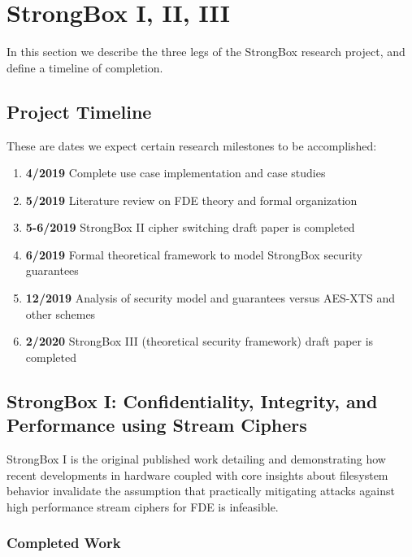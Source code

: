 \chapter{StrongBox I, II, III} \label{chp:strongbox}

In this section we describe the three legs of the StrongBox research project,
and define a timeline of completion.

\section{Project Timeline}

These are dates we expect certain research milestones to be accomplished:

\begin{enumerate}
    \item \textbf{4/2019} Complete use case implementation and case studies
    \item \textbf{5/2019} Literature review on FDE theory and formal
    organization
    \item \textbf{5-6/2019} StrongBox II cipher switching draft paper is
    completed
    \item \textbf{6/2019} Formal theoretical framework to model StrongBox
    security guarantees
    \item \textbf{12/2019} Analysis of security model and guarantees versus
    AES-XTS and other schemes
    \item \textbf{2/2020} StrongBox III (theoretical security framework) draft
    paper is completed
\end{enumerate}

\section{StrongBox I: Confidentiality, Integrity, and Performance using Stream Ciphers}

StrongBox I is the original published work detailing and demonstrating how
recent developments in hardware coupled with core insights about filesystem
behavior invalidate the assumption that practically mitigating attacks against
high performance stream ciphers for FDE is infeasible.

\subsection{Completed Work}

